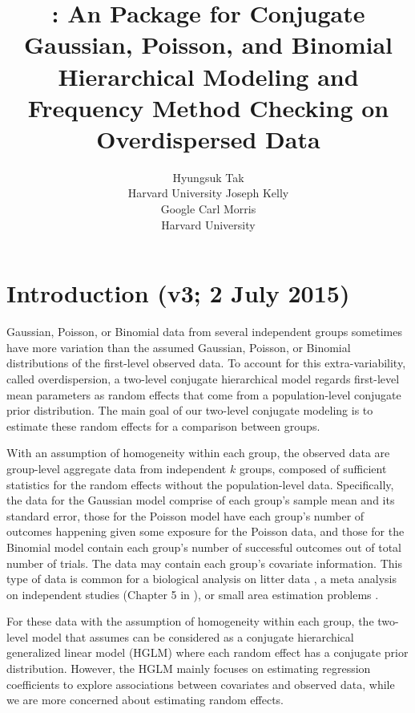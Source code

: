 \documentclass[article]{jss}
\author{Hyungsuk Tak\\Harvard University \And 
             Joseph Kelly\\Google\And
             Carl Morris\\ Harvard University}
\title{\pkg{Rgbp}: An \proglang{R} Package for Conjugate Gaussian, Poisson, and Binomial Hierarchical Modeling and Frequency Method Checking on Overdispersed Data}
\begin{document}

\section[Introduction]{Introduction (v3; 2 July 2015)}
Gaussian, Poisson, or Binomial data from several independent groups sometimes have more variation than the assumed Gaussian, Poisson, or Binomial distributions of the first-level observed data. To account for this extra-variability, called overdispersion, a  two-level conjugate hierarchical model regards first-level mean parameters as random effects that come from a population-level conjugate prior distribution. The main  goal of our two-level conjugate modeling is to estimate these random effects for a comparison between groups.



With an assumption of homogeneity within each group, the observed data are group-level aggregate data from independent $k$ groups, composed of sufficient statistics for the random effects without the population-level data. Specifically, the data for the Gaussian model comprise of each group's sample mean and its standard error, those for the Poisson model have each group's number of outcomes happening given some exposure for the Poisson data, and those for the Binomial model contain each group's number of successful outcomes out of total number of trials. The data may contain each group's covariate information. This type of  data is common for a biological analysis on litter data \citep{tamura1987stabilized}, a meta analysis on independent studies (Chapter 5 in \cite{gelman2014bayesian}), or small area estimation problems \citep{ghosh1994small, rao2003small}.  

For these data with the assumption of homogeneity within each group, the two-level model that  assumes can be considered as a conjugate hierarchical generalized linear model (HGLM) \citep{lee1996hierarchical, hglm2006} where each random effect has a conjugate prior distribution. However, the HGLM mainly focuses on estimating regression coefficients to explore associations between covariates and observed data, while we are more concerned about estimating random effects.
\end{document}
